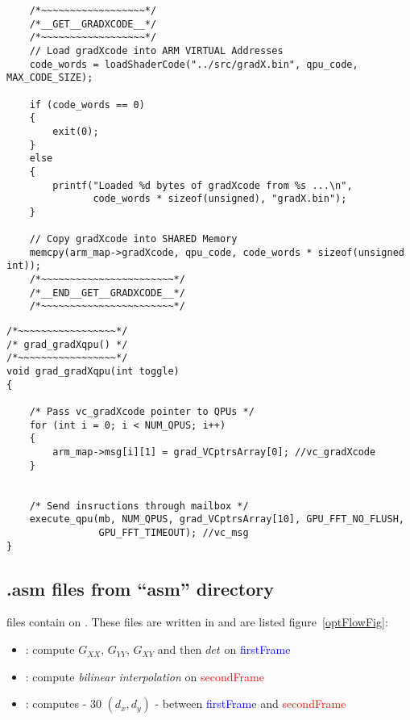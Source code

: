 \begin{lstlisting}
    /*~~~~~~~~~~~~~~~~~~*/
    /*__GET__GRADXCODE__*/
    /*~~~~~~~~~~~~~~~~~~*/
    // Load gradXcode into ARM VIRTUAL Addresses
    code_words = loadShaderCode("../src/gradX.bin", qpu_code, MAX_CODE_SIZE);

    if (code_words == 0)
    {
        exit(0);
    }
    else
    {
        printf("Loaded %d bytes of gradXcode from %s ...\n",
               code_words * sizeof(unsigned), "gradX.bin");
    }

    // Copy gradXcode into SHARED Memory
    memcpy(arm_map->gradXcode, qpu_code, code_words * sizeof(unsigned int));
    /*~~~~~~~~~~~~~~~~~~~~~~~*/
    /*__END__GET__GRADXCODE__*/
    /*~~~~~~~~~~~~~~~~~~~~~~~*/
\end{lstlisting}

\begin{lstlisting}
/*~~~~~~~~~~~~~~~~~*/
/* grad_gradXqpu() */
/*~~~~~~~~~~~~~~~~~*/
void grad_gradXqpu(int toggle)
{

    /* Pass vc_gradXcode pointer to QPUs */
    for (int i = 0; i < NUM_QPUS; i++)
    {
        arm_map->msg[i][1] = grad_VCptrsArray[0]; //vc_gradXcode
    }


    /* Send insructions through mailbox */
    execute_qpu(mb, NUM_QPUS, grad_VCptrsArray[10], GPU_FFT_NO_FLUSH,
                GPU_FFT_TIMEOUT); //vc_msg
}
\end{lstlisting}


\subsection{.asm files from \enquote{asm} directory}

 files contain  on \vc. These files are written in  and are listed figure~\ref{optFlowFig}:
\begin{itemize}
	\item {}: compute $G_{XX}$, $G_{YY}$, $G_{XY}$ and then $det$ on \textcolor{blue}{firstFrame}
	\item {}: compute \emph{bilinear interpolation} on \textcolor{red}{secondFrame}
	\item {}: computes \flow{} - 30 $(d_{x},d_{y})$ - between \textcolor{blue}{firstFrame} and \textcolor{red}{secondFrame}
\end{itemize}


